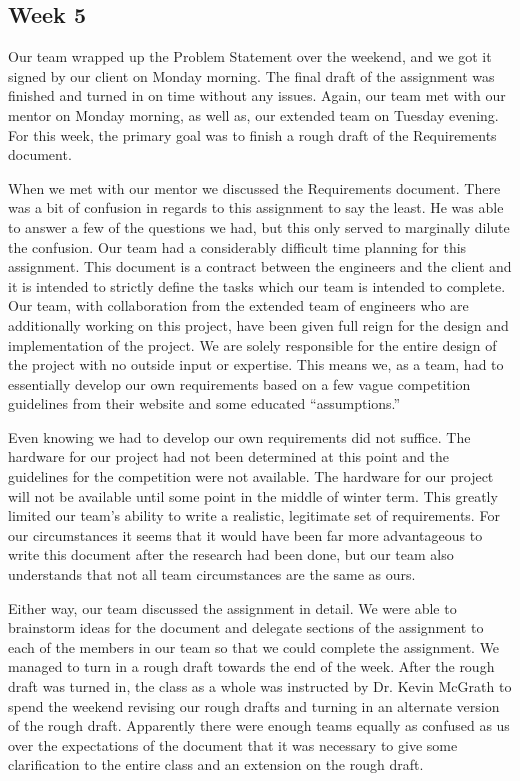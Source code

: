 \documentclass[10pt,letterpaper,onecolumn,draftclsnofoot,journal]{IEEEtran}
\begin{document}
\subsection{Week 5}
Our team wrapped up the Problem Statement over the weekend, and we got it signed by our client on Monday morning.  The final draft of the assignment was finished and turned in on time without any issues. Again, our team met with our mentor on Monday morning, as well as, our extended team on Tuesday evening. For this week, the primary goal was to finish a rough draft of the Requirements document.\vspace{.3cm}
\par
When we met with our mentor we discussed the Requirements document. There was a bit of confusion in regards to this assignment to say the least. He was able to answer a few of the questions we had, but this only served to marginally dilute the confusion.
Our team had a considerably difficult time planning for this assignment. This document is a contract between the engineers and the client and it is intended to strictly define the tasks which our team is intended to complete. Our team, with collaboration from the extended team of engineers who are additionally working on this project, have been given full reign for the design and implementation of the project. We are solely responsible for the entire design of the project with no outside input or expertise. This means we, as a team, had to essentially develop our own requirements based on a few vague competition guidelines from their website and some educated “assumptions.”\vspace{.3cm}
\par 
Even knowing we had to develop our own requirements did not suffice. The hardware for our project had not been determined at this point and the guidelines for the competition were not available. The hardware for our project will not be available until some point in the middle of winter term. This greatly limited our team's ability to write a realistic, legitimate set of requirements. For our circumstances it seems that it would have been far more advantageous to write this document after the research had been done, but our team also understands that not all team circumstances are the same as ours.\vspace{.3cm}
\par
Either way, our team discussed the assignment in detail. We were able to brainstorm ideas for the document and delegate sections of the assignment to each of the members in our team so that we could complete the assignment. We managed to turn in a rough draft towards the end of the week. After the rough draft was turned in, the class as a whole was instructed by Dr. Kevin McGrath to spend the weekend revising our rough drafts and turning in an alternate version of the rough draft. Apparently there were enough teams equally as confused as us over the expectations of the document that it was necessary to give some clarification to the entire class and an extension on the rough draft.\vspace{.3cm}
\end{document}
